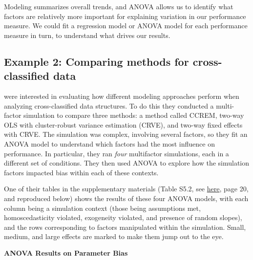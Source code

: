 \documentclass[
]{book}
\begin{document}
Modeling summarizes overall trends, and ANOVA allows us to identify what factors are relatively more important for explaining variation in our performance measure.
We could fit a regression model or ANOVA model for each performance measure in turn, to understand what drives our results.

\subsection{Example 2: Comparing methods for cross-classified data}\label{example-2-comparing-methods-for-cross-classified-data}

\citet{lee2023comparing} were interested in evaluating how different modeling approaches perform when analyzing cross-classified data structures.
To do this they conducted a multi-factor simulation to compare three methods: a method called CCREM, two-way OLS with cluster-robust variance estimation (CRVE), and two-way fixed effects with CRVE.
The simulation was complex, involving several factors, so they fit an ANOVA model to understand which factors had the most influence on performance.
In particular, they ran \emph{four} multifactor simulations, each in a different set of conditions.
They then used ANOVA to explore how the simulation factors impacted bias within each of these contexts.

One of their tables in the supplementary materials (Table S5.2, see \href{https://osf.io/hy73g}{here}, page 20, and reproduced below) shows the results of these four ANOVA models, with each column being a simulation context (those being assumptions met, homoscedasticity violated, exogeneity violated, and presence of random slopes), and the rows corresponding to factors manipulated within the simulation.
Small, medium, and large effects are marked to make them jump out to the eye.

\textbf{ANOVA Results on Parameter Bias}
\end{document}
